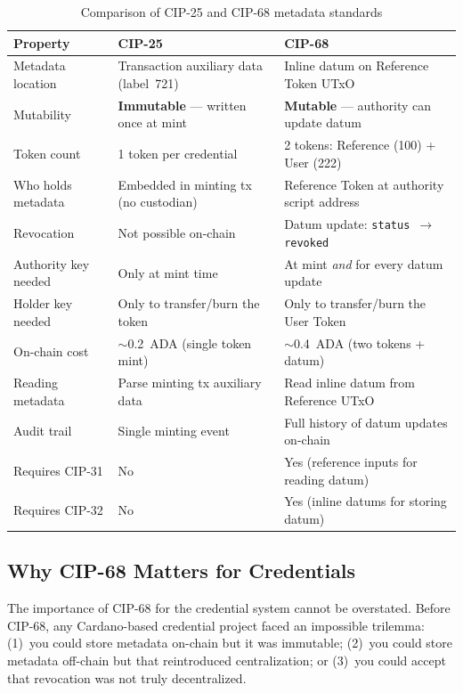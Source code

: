 \begin{table}[ht]
\centering
\caption{Comparison of CIP-25 and CIP-68 metadata standards}
\label{tab:cip25-vs-cip68}
\small
\begin{tabular}{@{}p{3.2cm}p{4.8cm}p{4.8cm}@{}}
\toprule
\textbf{Property} & \textbf{CIP-25} & \textbf{CIP-68} \\
\midrule
Metadata location & Transaction auxiliary data (label~721) & Inline datum on Reference Token UTxO \\
Mutability & \textbf{Immutable} --- written once at mint & \textbf{Mutable} --- authority can update datum \\
Token count & 1 token per credential & 2 tokens: Reference (100) + User (222) \\
Who holds metadata & Embedded in minting tx (no custodian) & Reference Token at authority script address \\
Revocation & Not possible on-chain & Datum update: \texttt{status $\to$ revoked} \\
Authority key needed & Only at mint time & At mint \emph{and} for every datum update \\
Holder key needed & Only to transfer/burn the token & Only to transfer/burn the User Token \\
On-chain cost & $\sim$0.2~ADA (single token mint) & $\sim$0.4~ADA (two tokens + datum) \\
Reading metadata & Parse minting tx auxiliary data & Read inline datum from Reference UTxO \\
Audit trail & Single minting event & Full history of datum updates on-chain \\
Requires CIP-31 & No & Yes (reference inputs for reading datum) \\
Requires CIP-32 & No & Yes (inline datums for storing datum) \\
\bottomrule
\end{tabular}
\end{table}

\subsection{Why CIP-68 Matters for Credentials}

The importance of CIP-68 for the credential system cannot be overstated.
Before CIP-68, any Cardano-based credential project faced an impossible
trilemma: (1)~you could store metadata on-chain but it was immutable; (2)~you
could store metadata off-chain but that reintroduced centralization; or
(3)~you could accept that revocation was not truly decentralized.

